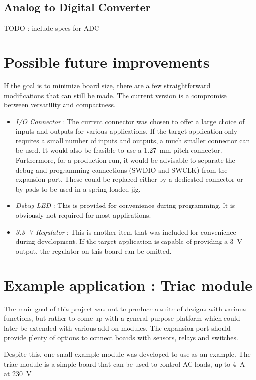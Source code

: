 \subsection{Analog to Digital Converter}\label{sub:adc}

TODO : include specs for ADC
\section{Possible future improvements}

If the goal is to minimize board size, there are a few straightforward
modifications that can still be made. The current version is a compromise
between versatility and compactness.

\begin{itemize}
  \item \emph{I/O Connector} : The current connector was chosen to offer a large
    choice of inputs and outputs for various applications. If the target
    application only requires a small number of inputs and outputs, a much
    smaller connector can be used. It would also be feasible to use
    a \SI{1.27}{mm} pitch connector. 
    Furthermore, for a production run, it would be advisable to separate the
    debug and programming connections (SWDIO and SWCLK) from the expansion port.
    These could be replaced either by a dedicated connector or by pads to be
    used in a spring-loaded jig.
  \item \emph{Debug LED} : This is provided for convenience during programming.
    It is obviously not required for most applications. 
  \item \emph{\SI{3.3}{V} Regulator} : This is another item that was included
    for convenience during development. If the target application is capable of
    providing a \SI{3}{V} output, the regulator on this board can be omitted.
\end{itemize}

\section{Example application : Triac module}

The main goal of this project was not to produce a suite of designs with various
functions, but rather to come up with a general-purpose platform which could
later be extended with various add-on modules. The expansion port should provide
plenty of options to connect boards with sensors, relays and switches.

Despite this, one small example module was developed to use as an example. The
triac module is a simple board that can be used to control AC loads, up to
\SI{4}{A} at \SI{230}{V}.

